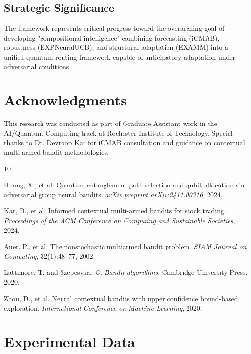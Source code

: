 \documentclass[11pt,a4paper]{article}
\begin{document}
\subsection{Strategic Significance}

The framework represents critical progress toward the overarching goal of developing "compositional intelligence" combining forecasting (iCMAB), robustness (EXPNeuralUCB), and structural adaptation (EXAMM) into a unified quantum routing framework capable of anticipatory adaptation under adversarial conditions.

\section{Acknowledgments}

This research was conducted as part of Graduate Assistant work in the AI/Quantum Computing track at Rochester Institute of Technology. Special thanks to Dr. Devroop Kar for iCMAB consultation and guidance on contextual multi-armed bandit methodologies.


\begin{thebibliography}{10}

Huang, X., et al.
\newblock Quantum entanglement path selection and qubit allocation via adversarial group neural bandits.
\newblock \emph{arXiv preprint arXiv:2411.00316}, 2024.

Kar, D., et al.
\newblock Informed contextual multi-armed bandits for stock trading.
\newblock \emph{Proceedings of the ACM Conference on Computing and Sustainable Societies}, 2024.

Auer, P., et al.
\newblock The nonstochastic multiarmed bandit problem.
\newblock \emph{SIAM Journal on Computing}, 32(1):48--77, 2002.

Lattimore, T. and Szepesvári, C.
\newblock \emph{Bandit algorithms}.
\newblock Cambridge University Press, 2020.

Zhou, D., et al.
\newblock Neural contextual bandits with upper confidence bound-based exploration.
\newblock \emph{International Conference on Machine Learning}, 2020.

\end{thebibliography}

\appendix

\section{Experimental Data}
\end{document}
